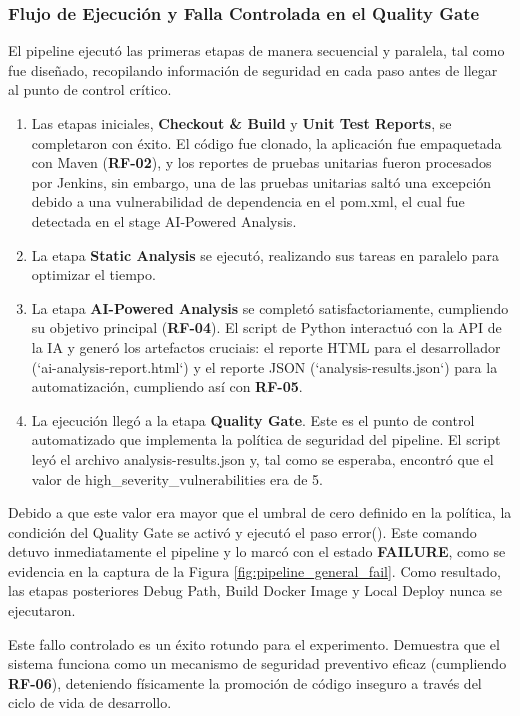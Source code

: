 \subsubsection{Flujo de Ejecución y Falla Controlada en el Quality Gate}
El pipeline ejecutó las primeras etapas de manera secuencial y paralela, tal como fue diseñado, recopilando información de seguridad en cada paso antes de llegar al punto de control crítico.

\begin{enumerate}
    \item Las etapas iniciales, \textbf{Checkout \& Build} y \textbf{Unit Test Reports}, se completaron con éxito. El código fue clonado, la aplicación fue empaquetada con Maven (\textbf{RF-02}), y los reportes de pruebas unitarias fueron procesados por Jenkins, sin embargo, una de las pruebas unitarias saltó una excepción debido a una vulnerabilidad de dependencia en el pom.xml, el cual fue detectada en el stage AI-Powered Analysis.
    \item La etapa \textbf{Static Analysis} se ejecutó, realizando sus tareas en paralelo para optimizar el tiempo.
    \item La etapa \textbf{AI-Powered Analysis} se completó satisfactoriamente, cumpliendo su objetivo principal (\textbf{RF-04}). El script de Python interactuó con la API de la IA y generó los artefactos cruciais: el reporte HTML para el desarrollador (`ai-analysis-report.html`) y el reporte JSON (`analysis-results.json`) para la automatización, cumpliendo así con \textbf{RF-05}.
    \item La ejecución llegó a la etapa \textbf{Quality Gate}. Este es el punto de control automatizado que implementa la política de seguridad del pipeline. El script leyó el archivo analysis-results.json y, tal como se esperaba, encontró que el valor de high\_severity\_vulnerabilities era de 5. 
\end{enumerate}

Debido a que este valor era mayor que el umbral de cero definido en la política, la condición del Quality Gate se activó y ejecutó el paso error(). Este comando detuvo inmediatamente el pipeline y lo marcó con el estado \textbf{FAILURE}, como se evidencia en la captura de la Figura \ref{fig:pipeline_general_fail}. Como resultado, las etapas posteriores Debug Path, Build Docker Image y Local Deploy nunca se ejecutaron.

Este fallo controlado es un éxito rotundo para el experimento. Demuestra que el sistema funciona como un mecanismo de seguridad preventivo eficaz (cumpliendo \textbf{RF-06}), deteniendo físicamente la promoción de código inseguro a través del ciclo de vida de desarrollo.

